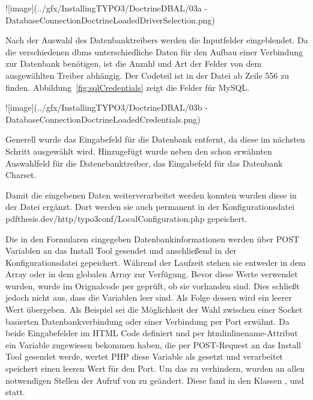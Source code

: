 ![image](../gfx/InstallingTYPO3/DoctrineDBAL/03a - DatabaseConnectionDoctrineLoadedDriverSelection.png)

Nach der Auswahl des Datenbanktreibers werden die Inputfelder eingeblendet. Da die verschiedenen \gls{dbms} unterschiedliche Daten für den Aufbau einer Verbindung zur Datenbank benötigen, ist die Anzahl und Art der Felder von dem ausgewählten Treiber abhängig. Der Codeteil ist in der Datei  ab Zeile 556 zu finden. Abbildung~\ref{fig:sqlCredentials} zeigt die  Felder für MySQL.

![image](../gfx/InstallingTYPO3/DoctrineDBAL/03b - DatabaseConnectionDoctrineLoadedCredentials.png)

Generell wurde das Eingabefeld für die Datenbank entfernt, da diese im nächsten Schritt ausgewählt wird. Hinzugefügt wurde neben den schon erwähnten Auswahlfeld für die Datenebanktreiber, das Eingabefeld für das Datenbank Charset.

Damit die eingebenen Daten weiterverarbeitet werden konnten wurden diese in der Datei  ergänzt. Dort werden sie auch permanent in der Konfigurationsdatei pdf{thesis.dev/http/typo3conf/LocalConfiguration.php} gepeichert.

\begin{listing}
\end{listing}

Die in den Formularen eingegeben Datenbankinformationen werden über POST Variablen an das Install Tool gesendet und anschließend in der Konfigurationsdatei  gepeichert. Während der Laufzeit stehen sie entweder in dem Array  oder in dem globalen Array  zur Verfügung. Bevor diese Werte verwendet wurden, wurde im Orignalcode per  geprüft, ob sie vorhanden sind. Dies schließt jedoch nicht aus, dass die Variablen leer sind. Als Folge dessen wird ein leerer Wert übergeben. Als Beispiel sei die Möglichkeit der Wahl zwischen einer Socket basierten Datenbankverbindung oder einer Verbindung per Port erwähnt. Da beide Eingabefelder im HTML Code definiert und per htmlinline{name}-Attribut ein Variable zugewiesen bekommen haben, die per POST-Request an das Install Tool gesendet werde, wertet PHP diese Variable als gesetzt und verarbeitet speichert einen leeren Wert für den Port. Um das zu verhindern, wurden an allen notwendigen Stellen der Aufruf von  zu  geändert. Diese fand in den Klassen ,  und  statt.

